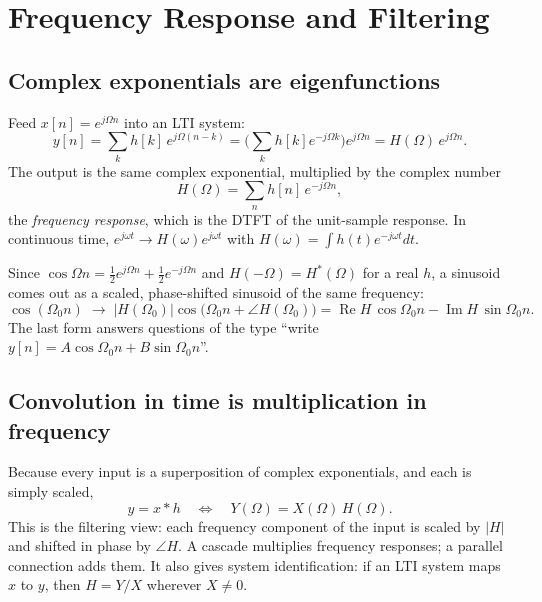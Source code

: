 \documentclass[11pt]{article}
\numberwithin{equation}{section}
\theoremstyle{definition}
\theoremstyle{remark}
\begin{document}
\section{Frequency Response and Filtering}

\subsection{Complex exponentials are eigenfunctions}
Feed $x[n]=e^{j\Omega n}$ into an LTI system:
\begin{equation}
y[n]=\sum_k h[k]\,e^{j\Omega(n-k)}=\Big(\sum_k h[k]e^{-j\Omega k}\Big)e^{j\Omega n}=H(\Omega)\,e^{j\Omega n}.
\end{equation}
The output is the same complex exponential, multiplied by the complex number
\begin{equation}
\boxed{\;H(\Omega)=\sum_{n}h[n]\,e^{-j\Omega n},\;}
\end{equation}
the \emph{frequency response}, which is the DTFT of the unit-sample response. In continuous time,
$e^{j\omega t}\to H(\omega)e^{j\omega t}$ with $H(\omega)=\int h(t)e^{-j\omega t}dt$.

Since $\cos\Omega n=\frac12e^{j\Omega n}+\frac12e^{-j\Omega n}$ and $H(-\Omega)=H^*(\Omega)$ for a real
$h$, a sinusoid comes out as a scaled, phase-shifted sinusoid of the same frequency:
\begin{equation}
\cos(\Omega_0 n)\;\longrightarrow\;|H(\Omega_0)|\cos\!\big(\Omega_0n+\angle H(\Omega_0)\big)
=\operatorname{Re}H\,\cos\Omega_0n-\operatorname{Im}H\,\sin\Omega_0n.
\label{eq:sinusoid}
\end{equation}
The last form answers questions of the type ``write $y[n]=A\cos\Omega_0n+B\sin\Omega_0n$''.

\subsection{Convolution in time is multiplication in frequency}
Because every input is a superposition of complex exponentials, and each is simply scaled,
\begin{equation}
y=x*h\quad\Longleftrightarrow\quad Y(\Omega)=X(\Omega)\,H(\Omega).
\end{equation}
This is the filtering view: each frequency component of the input is scaled by $|H|$ and
shifted in phase by $\angle H$. A cascade multiplies frequency responses; a parallel connection
adds them. It also gives system identification: if an LTI system maps $x$ to $y$, then
$H=Y/X$ wherever $X\ne0$.
\end{document}
